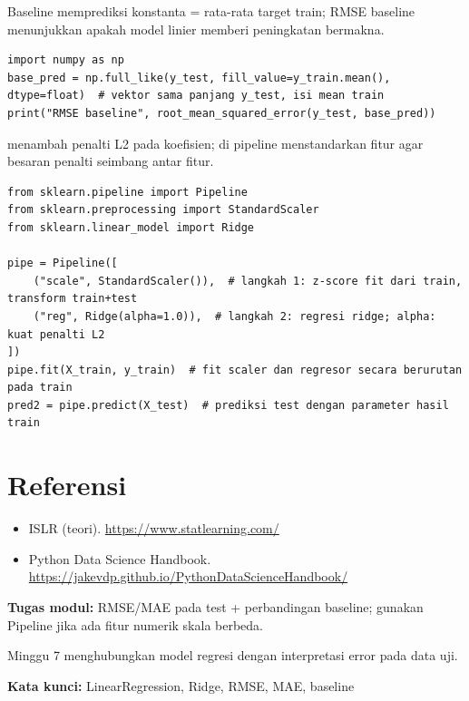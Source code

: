 \documentclass[../main.tex]{subfiles}
\begin{document}
\MulaiPenjelasanKode Baseline memprediksi konstanta = rata-rata target train; RMSE baseline menunjukkan apakah model linier memberi peningkatan bermakna. \SelesaiPenjelasanKode

\begin{lstlisting}[caption=Baseline prediksi rata-rata]
import numpy as np
base_pred = np.full_like(y_test, fill_value=y_train.mean(), dtype=float)  # vektor sama panjang y_test, isi mean train
print("RMSE baseline", root_mean_squared_error(y_test, base_pred))
\end{lstlisting}

\MulaiPenjelasanKode {} menambah penalti L2 pada koefisien;  di pipeline menstandarkan fitur agar besaran penalti seimbang antar fitur. \SelesaiPenjelasanKode

\begin{lstlisting}[caption=Pipeline dengan scaling (disarankan)]
from sklearn.pipeline import Pipeline
from sklearn.preprocessing import StandardScaler
from sklearn.linear_model import Ridge

pipe = Pipeline([
    ("scale", StandardScaler()),  # langkah 1: z-score fit dari train, transform train+test
    ("reg", Ridge(alpha=1.0)),  # langkah 2: regresi ridge; alpha: kuat penalti L2
])
pipe.fit(X_train, y_train)  # fit scaler dan regresor secara berurutan pada train
pred2 = pipe.predict(X_test)  # prediksi test dengan parameter hasil train
\end{lstlisting}

\section{Referensi}

\begin{itemize}[leftmargin=*]
  \item ISLR (teori). \url{https://www.statlearning.com/}
  \item Python Data Science Handbook. \url{https://jakevdp.github.io/PythonDataScienceHandbook/}
\end{itemize}

\begin{asesmen}
\textbf{Tugas modul:} RMSE/MAE pada test + perbandingan baseline; gunakan Pipeline jika ada fitur numerik skala berbeda.
\end{asesmen}

\begin{rangkuman}
Minggu 7 menghubungkan model regresi dengan interpretasi error pada data uji.

\textbf{Kata kunci:} LinearRegression, Ridge, RMSE, MAE, baseline
\end{rangkuman}
\end{document}
